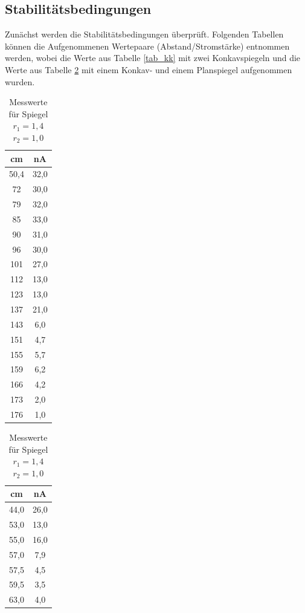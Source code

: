 \subsection{Stabilitätsbedingungen}
Zunächst werden die Stabilitätsbedingungen überprüft. Folgenden Tabellen können die Aufgenommenen Wertepaare (Abstand/Stromstärke) entnommen werden, wobei die Werte aus Tabelle \ref{tab_kk} mit zwei Konkavspiegeln und die Werte aus Tabelle \ref{tab_kf} mit einem Konkav- und einem Planspiegel aufgenommen wurden.
\begin{table}[H]
	\begin{minipage}[t]{0.45\textwidth} 
	\renewcommand{\arraystretch}{0.9}
	\begin{tabular}[t]{c|c}
	cm & nA\\ \hline
	50,4 &   32,0\\
 	72    &  30,0\\
 	79     & 32,0\\
 	85      &33,0\\
 	90      &31,0\\
 	96      &30,0\\
 	101     &27,0\\
 	112     &13,0\\
 	123     &13,0\\
 	137     &21,0\\
 	143     &6,0\\
 	151     &4,7\\
 	155     &5,7\\
 	159     &6,2\\
 	166     &4,2\\
 	173     &2,0\\
 	176     &1,0
	\end{tabular}
	\caption{Messwerte für Spiegel\newline $r_1=1,4$ $r_2=1,4$}
	\label{tab_kk}
	\end{minipage}
	\begin{minipage}[t]{0.45\textwidth} 
	\begin{tabular}[t]{c|c}
	cm & nA\\ \hline
	44,0&    26,0\\
	53,0&    13,0\\
	55,0&    16,0\\
	57,0&    7,9\\
	57,5&    4,5\\
	59,5&    3,5\\
	63,0&    4,0
	\end{tabular}
	\renewcommand{\arraystretch}{1}
	\caption{Messwerte für Spiegel \newline $r_1=1,4$  $r_2=1,0$}
	\label{tab_kf}
	\end{minipage}
\end{table}

